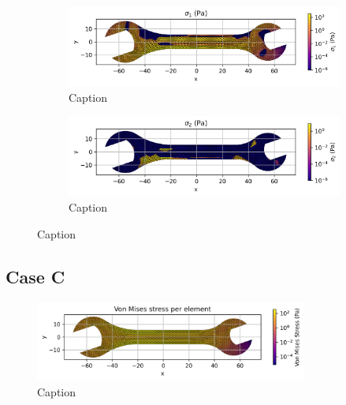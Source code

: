     \begin{figure}[H]
        \centering
        \begin{subfigure}[t]{0.49\textwidth}
        \centering
        \includegraphics[width=\textwidth]{GRAFICOS/Case b - sigma_1_per_element.png}
        \caption{Caption}
        \label{fig:deformada_reacciones}
        \end{subfigure}
        \hfill
        \begin{subfigure}[t]{0.49\textwidth}
        \centering
        \includegraphics[width=\textwidth]{GRAFICOS/Case b - sigma_2_per_element.png}
        \caption{Caption}
        \label{fig:von_mises}
        \end{subfigure}
        \caption{Caption}
        \label{fig:analisis_estructural}
    \end{figure}

\subsection{Case C}

\begin{figure}[H]
    \centering
    \includegraphics[width=0.8\textwidth]{GRAFICOS/Case c_von_mises_per_element.png}
    \caption{Caption}
    \label{fig:strain}
  \end{figure}

